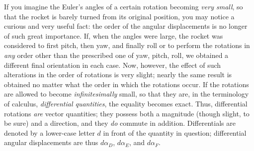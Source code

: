 If you imagine the Euler's angles of a certain rotation becoming \emph{very
small}, so that the rocket is barely turned from its original position, you may
notice a curious and very useful fact: the order of the angular displacements
is no longer of such great importance. If, when the angles were large, the
rocket was considered to first pitch, then yaw, and finally roll or to perform
the rotations in \emph{any} order other than the prescribed one of yaw, pitch,
roll, we obtained a different final orientation in each case. Now, however, the
effect of such alterations in the order of rotations is very slight; nearly the
same result is obtained no matter what the order in which the rotations occur.
If the rotations are allowed to become \emph{infinitesimally} small, so that
they are, in the terminology of calculus, \emph{differential quantities}, the
equality becomes exact. Thus, differential rotations \emph{are} vector
quantities; they possess both a magnitude (though slight, to be sure) and a
direction, and they \emph{do} commute in addition. Differentials are denoted by
a lower-case letter $d$ in front of the quantity in question; differential
angular displacements are thus $d\alpha_D$, $d\alpha_E$, and $d\alpha_F$.


